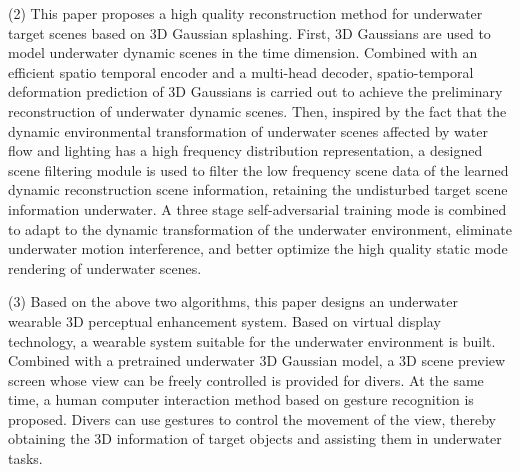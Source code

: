 \begin{abstract*}
(2) This paper proposes a high quality reconstruction method for underwater target scenes based on 3D Gaussian splashing. 
First, 3D Gaussians are used to model underwater dynamic scenes in the time dimension. Combined with an efficient spatio temporal encoder and a multi-head decoder, spatio-temporal deformation prediction of 3D Gaussians is carried out to achieve the preliminary reconstruction of underwater dynamic scenes. 
Then, inspired by the fact that the dynamic environmental transformation of underwater scenes affected by water flow and lighting has a high frequency distribution representation, a designed scene filtering module is used to filter the low frequency scene data of the learned dynamic reconstruction scene information, retaining the undisturbed target scene information underwater. 
A three stage self-adversarial training mode is combined to adapt to the dynamic transformation of the underwater environment, eliminate underwater motion interference, and better optimize the high quality static mode rendering of underwater scenes.

(3) Based on the above two algorithms, this paper designs an underwater wearable 3D perceptual enhancement system.
Based on virtual display technology, a wearable system suitable for the underwater environment is built.
Combined with a pretrained underwater 3D Gaussian model, a 3D scene preview screen whose view can be freely controlled is provided for divers. 
At the same time, a human computer interaction method based on gesture recognition is proposed. Divers can use gestures to control the movement of the view, thereby obtaining the 3D information of target objects and assisting them in underwater tasks.

\end{abstract*}
